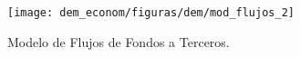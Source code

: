  \begin{figure}[H]
	 \centering
	 \texttt{[image: dem\_econom/figuras/dem/mod\_flujos\_2]}
	 \caption{Modelo de Flujos de Fondos a Terceros.}
	 \label{dem-figuras:mod_flujos}

 \end{figure}


